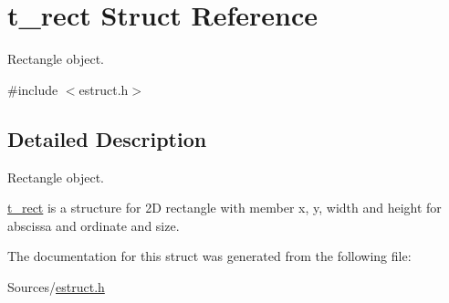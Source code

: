 \hypertarget{structt__rect}{\section{t\-\_\-rect Struct Reference}
\label{structt__rect}
}


Rectangle object.  




{\ttfamily \#include $<$estruct.\-h$>$}



\subsection{Detailed Description}
Rectangle object. 

\hyperlink{structt__rect}{t\-\_\-rect} is a structure for 2\-D rectangle with member x, y, width and height for abscissa and ordinate and size. 

The documentation for this struct was generated from the following file\-:\begin{DoxyCompactItemize}
\item 
Sources/\hyperlink{estruct_8h}{estruct.\-h}\end{DoxyCompactItemize}
